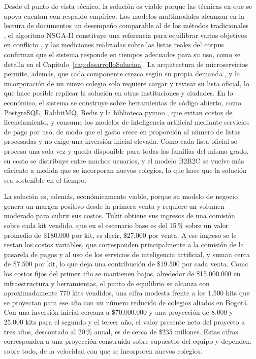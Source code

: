 Desde el punto de vista técnico, la solución es viable porque las técnicas en que se apoya
cuentan con respaldo empírico. Los modelos multimodales alcanzan en la lectura de documentos
un desempeño comparable al de los métodos tradicionales \citep{shen_ocr_2026}, el algoritmo
NSGA-II constituye una referencia para equilibrar varios objetivos en conflicto
\citep{deb_fast_2002}, y las mediciones realizadas sobre las listas reales del corpus
confirman que el sistema responde en tiempos adecuados para su uso, como se detalla en el
Capítulo~\ref{cap:desarrolloSolucion}. La arquitectura de microservicios permite, además,
que cada componente crezca según su propia demanda \citep{newman_building_2021}, y la
incorporación de un nuevo colegio solo requiere cargar y revisar su lista oficial, lo que
hace posible replicar la solución en otras instituciones y ciudades. En lo económico, el
sistema se construye sobre herramientas de código abierto, como PostgreSQL, RabbitMQ, Redis
y la biblioteca pymoo \citep{blank_pymoo_2020}, que evitan costos de licenciamiento, y
consume los modelos de inteligencia artificial mediante servicios de pago por uso, de modo
que el gasto crece en proporción al número de listas procesadas y no exige una inversión
inicial elevada. Como cada lista oficial se procesa una sola vez y queda disponible para
todas las familias del mismo grado, su costo se distribuye entre muchos usuarios, y el
modelo B2B2C se vuelve más eficiente a medida que se incorporan nuevos colegios, lo que hace
que la solución sea sostenible en el tiempo.\par

La solución es, además, económicamente viable, porque su modelo de negocio genera un margen
positivo desde la primera venta y requiere un volumen moderado para cubrir sus costos. Tukit
obtiene sus ingresos de una comisión sobre cada kit vendido, que en el escenario base es del
15\,\% sobre un valor promedio de \$180.000 por kit, es decir, \$27.000 por venta. A ese
ingreso se le restan los costos variables, que corresponden principalmente a la comisión de
la pasarela de pagos y al uso de los servicios de inteligencia artificial, y suman cerca de
\$7.500 por kit, lo que deja una contribución de \$19.500 por cada venta. Como los costos
fijos del primer año se mantienen bajos, alrededor de \$15.000.000 en infraestructura y
herramientas, el punto de equilibrio se alcanza con aproximadamente 770 kits vendidos, una
cifra modesta frente a los 1.500 kits que se proyectan para ese año con un número reducido
de colegios aliados en Bogotá. Con una inversión inicial cercana a \$70.000.000 y una
proyección de 8.000 y 25.000 kits para el segundo y el tercer año, el valor presente neto
del proyecto a tres años, descontado al 20\,\% anual, es de cerca de \$235 millones. Estas
cifras corresponden a una proyección construida sobre supuestos del equipo y dependen, sobre
todo, de la velocidad con que se incorporen nuevos colegios.\par

